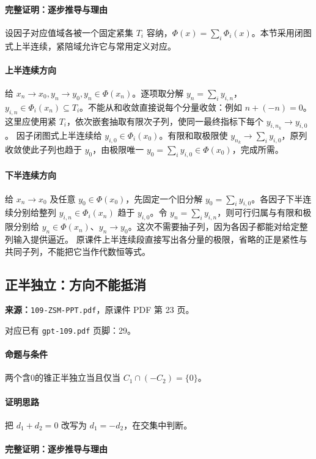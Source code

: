\paragraph{完整证明：逐步推导与理由}

设因子对应值域各被一个固定紧集 $T_i$ 容纳，$\Phi(x)=\sum_i\Phi_i(x)$。本节采用闭图式上半连续，紧陪域允许它与常用定义对应。
\paragraph{上半连续方向}
给 $x_n\to x_0,y_n\to y_0,y_n\in\Phi(x_n)$。逐项取分解 $y_n=\sum_i y_{i,n}$，$y_{i,n}\in\Phi_i(x_n)\subseteq T_i$。不能从和收敛直接说每个分量收敛：例如 $n+(-n)=0$。这里应使用紧 $T_i$，依次嵌套抽取有限次子列，使同一最终指标下每个 $y_{i,n_k}\to y_{i,0}$。
因子闭图式上半连续给 $y_{i,0}\in\Phi_i(x_0)$。有限和取极限使 $y_{n_k}\to\sum_i y_{i,0}$，原列收敛使此子列也趋于 $y_0$，由极限唯一 $y_0=\sum_i y_{i,0}\in\Phi(x_0)$，完成所需。
\paragraph{下半连续方向}
给 $x_n\to x_0$ 及任意 $y_0\in\Phi(x_0)$，先固定一个旧分解 $y_0=\sum_i y_{i,0}$。各因子下半连续分别给整列 $y_{i,n}\in\Phi_i(x_n)$ 趋于 $y_{i,0}$。令 $y_n=\sum_i y_{i,n}$，则可行归属与有限和极限分别给 $y_n\in\Phi(x_n)$、$y_n\to y_0$。这次不需要抽子列，因为各因子都能对给定整列输入提供逼近。
原课件上半连续段直接写出各分量的极限，省略的正是紧性与共同子列，不能把它当作代数恒等式。

\clearpage\subsection{正半独立：方向不能抵消}
\textbf{来源：}\texttt{109-ZSM-PPT.pdf}，原课件 PDF 第 23 页。\par
对应已有 \texttt{gpt-109.pdf} 页脚：29。\par
\paragraph{命题与条件}两个含0的锥正半独立当且仅当 $C_1\cap(-C_2)=\{0\}$。
\paragraph{证明思路}把 $d_1+d_2=0$ 改写为 $d_1=-d_2$，在交集中判断。
\paragraph{完整证明：逐步推导与理由}

